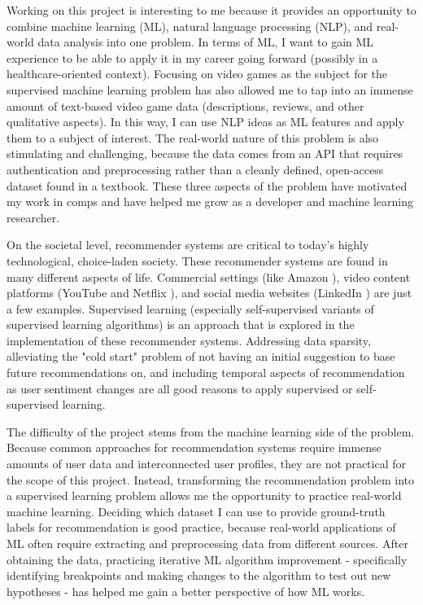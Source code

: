 \documentclass[10pt,twocolumn]{article}
\begin{document}
Working on this project is interesting to me because it provides an opportunity to combine machine learning (ML), natural language processing (NLP), and real-world data analysis into one problem. In terms of ML, I want to gain ML experience to be able to apply it in my career going forward (possibly in a healthcare-oriented context). Focusing on video games as the subject for the supervised machine learning problem has also allowed me to tap into an immense amount of text-based video game data (descriptions, reviews, and other qualitative aspects). In this way, I can use NLP ideas as ML features and apply them to a subject of interest. The real-world nature of this problem is also stimulating and challenging, because the data comes from an API that requires authentication and preprocessing rather than a cleanly defined, open-access dataset found in a textbook. These three aspects of the problem have motivated my work in comps and have helped me grow as a developer and machine learning researcher.

On the societal level, recommender systems are critical to today's highly technological, choice-laden society. These recommender systems are found in many different aspects of life. Commercial settings (like Amazon \cite{AmazonRS}), video content platforms (YouTube \cite{YouTubeRS} and Netflix \cite{NetflixRS}), and social media websites (LinkedIn \cite{LinkedInRS}) are just a few examples. Supervised learning (especially self-supervised variants of supervised learning algorithms) is an approach that is explored in the implementation of these recommender systems. Addressing data sparsity, alleviating the "cold start" problem of not having an initial suggestion to base future recommendations on, and including temporal aspects of recommendation as user sentiment changes are all good reasons to apply supervised or self-supervised learning. \cite{JYu, XXin, Matuszyk}

The difficulty of the project stems from the machine learning side of the problem. Because common approaches for recommendation systems require immense amounts of user data and interconnected user profiles, they are not practical for the scope of this project. Instead, transforming the recommendation problem into a supervised learning problem allows me the opportunity to practice real-world machine learning. Deciding which dataset I can use to provide ground-truth labels for recommendation is good practice, because real-world applications of ML often require extracting and preprocessing data from different sources. After obtaining the data, practicing iterative ML algorithm improvement - specifically identifying breakpoints and making changes to the algorithm to test out new hypotheses - has helped me gain a better perspective of how ML works.
\end{document}
